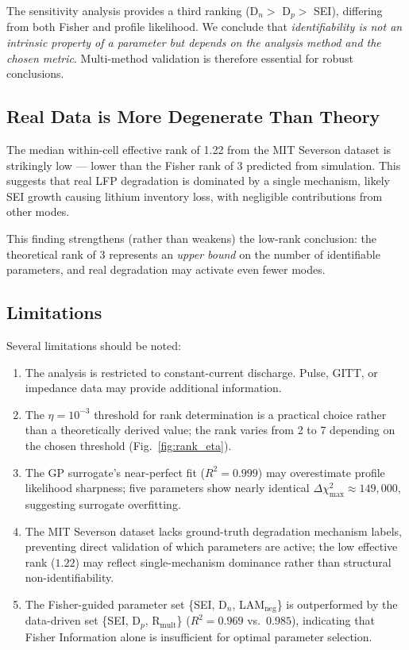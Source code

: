 \documentclass[preprint,12pt]{elsarticle}
\begin{document}
The sensitivity analysis provides a third ranking (D$_n >$ D$_p >$ SEI), differing from both Fisher and profile likelihood.
We conclude that \emph{identifiability is not an intrinsic property of a parameter but depends on the analysis method and the chosen metric}.
Multi-method validation is therefore essential for robust conclusions.

\subsection{Real Data is More Degenerate Than Theory}

The median within-cell effective rank of 1.22 from the MIT Severson dataset is strikingly low --- lower than the Fisher rank of 3 predicted from simulation.
This suggests that real LFP degradation is dominated by a single mechanism, likely SEI growth causing lithium inventory loss, with negligible contributions from other modes.

This finding strengthens (rather than weakens) the low-rank conclusion: the theoretical rank of 3 represents an \emph{upper bound} on the number of identifiable parameters, and real degradation may activate even fewer modes.

\subsection{Limitations}

Several limitations should be noted:
\begin{enumerate}
\item The analysis is restricted to constant-current discharge. Pulse, GITT, or impedance data may provide additional information.
\item The $\eta = 10^{-3}$ threshold for rank determination is a practical choice rather than a theoretically derived value; the rank varies from 2 to 7 depending on the chosen threshold (Fig.~\ref{fig:rank_eta}).
\item The GP surrogate's near-perfect fit ($R^2 = 0.999$) may overestimate profile likelihood sharpness; five parameters show nearly identical $\Delta\chi^2_{\max} \approx 149{,}000$, suggesting surrogate overfitting.
\item The MIT Severson dataset lacks ground-truth degradation mechanism labels, preventing direct validation of which parameters are active; the low effective rank ($1.22$) may reflect single-mechanism dominance rather than structural non-identifiability.
\item The Fisher-guided parameter set \{SEI, D$_n$, LAM$_{\mathrm{neg}}$\} is outperformed by the data-driven set \{SEI, D$_p$, R$_{\mathrm{mult}}$\} ($R^2 = 0.969$ vs.\ $0.985$), indicating that Fisher Information alone is insufficient for optimal parameter selection.
\end{enumerate}
\end{document}

